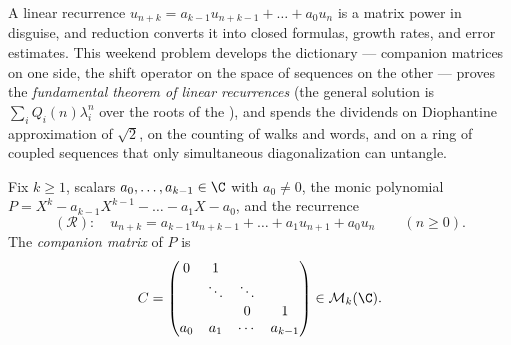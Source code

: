 A linear recurrence $u_{n+k} = a_{k-1}u_{n+k-1} + \dots + a_0 u_n$
is a matrix power in disguise, and reduction converts it into
closed formulas, growth rates, and error estimates. This weekend
problem develops the dictionary --- companion matrices on one
side, the shift operator on the space of sequences on the other
--- proves the \emph{fundamental theorem of linear recurrences}
(the general solution is $\sum_i Q_i(n)\lambda_i^n$ over the roots
of the ), and spends the dividends on
Diophantine approximation of $\sqrt2$, on the counting of walks
and words, and on a ring of coupled sequences that only
simultaneous diagonalization can untangle.

\begin{problem}
\label{pb:b2:reduction:1}
Fix $k \geq 1$, scalars $a_0, \dots, a_{k-1} \in \C$ with $a_0
\neq 0$, the monic polynomial $P = X^k - a_{k-1}X^{k-1} - \dots -
a_1 X - a_0$, and the recurrence
\[
(\mathcal R)\colon\quad u_{n+k} = a_{k-1}u_{n+k-1} + \dots +
a_1 u_{n+1} + a_0 u_n \qquad (n \geq 0).
\]
The \emph{companion matrix} of $P$ is
\[
C =
\begin{pmatrix}
0 & 1 & & \\
 & \ddots & \ddots & \\
 & & 0 & 1\\
a_0 & a_1 & \cdots & a_{k-1}
\end{pmatrix}
\in \mathcal{M}_k(\C).
\]


\end{problem}
